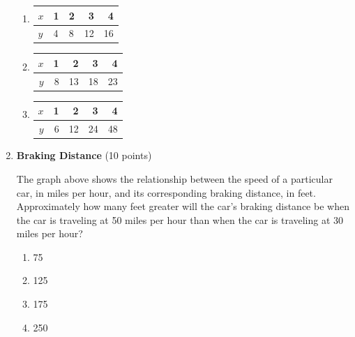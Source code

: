 \begin{enumerate}
\begin{enumerate}[label=(\Alph*)]
    \item 
    \begin{center}
    \begin{tabular}{|l|l|l|r|r|}
    \hline
    $x$ & 1 & 2 & 3 & 4 \\
    \hline
    $y$ & 4 & 8 & 12 & 16 \\
    \hline
    \end{tabular}
    \end{center}

    \item 
    \begin{center}
    \begin{tabular}{|r|r|r|r|r|}
    \hline
    $x$ & 1 & 2 & 3 & 4 \\
    \hline
    $y$ & 8 & 13 & 18 & 23 \\
    \hline
    \end{tabular}
    \end{center}

    \item 
    \begin{center}
    \begin{tabular}{|r|r|r|r|r|}
    \hline
    $x$ & 1 & 2 & 3 & 4 \\
    \hline
    $y$ & 6 & 12 & 24 & 48 \\
    \hline
    \end{tabular}
    \end{center}
  \end{enumerate}
  \begin{subanswer}
  \end{subanswer}


  \newpage

  \item \textbf{Braking Distance} (10 points)\\

  The graph above shows the relationship between the speed of a particular car, in miles per hour, and its corresponding braking distance, in feet. Approximately how many feet greater will the car's braking distance be when the car is traveling at 50 miles per hour than when the car is traveling at 30 miles per hour?
  \begin{enumerate}[label=(\Alph*)]
    \item 75
    \item 125
    \item 175
    \item 250
  \end{enumerate}
  \begin{subanswer}
  \end{subanswer}


\end{enumerate}
